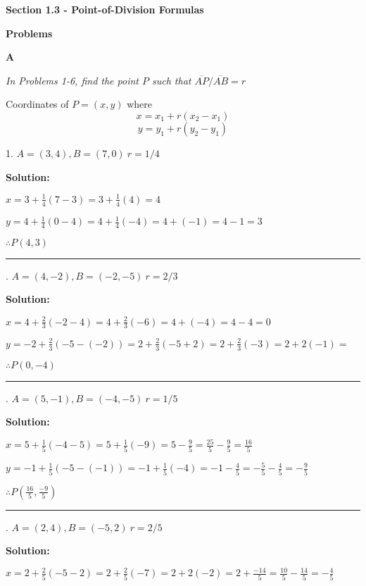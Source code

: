\documentclass[10pt,letterpaper]{article}
\begin{document}
\textbf{Section 1.3 - Point-of-Division Formulas}
\medskip

\textbf{Problems}

\medskip
\textbf{A}
\medskip

\textit{In Problems 1-6, find the point $P$ such that $\overline{AP}/\overline{AB} = r$}
\medskip

Coordinates of $P = (x,y)$ where 
\[ x=x_1 + r(x_2 - x_1)  \]
\[ y=y_1 + r(y_2 - y_1)  \]
\medskip

1. $A=(3,4), B=(7,0)\  r=1/4$

\medskip
{} {\textbf{{\color{blue}Solution}:}}

\medskip
$x =3 + \frac{1}{4} (7-3) = 3 + \frac{1}{4} (4) = 4$

\medskip
$y = 4 + \frac{1}{4}(0-4) = 4 + \frac{1}{4}(-4) = 4 + (-1) = 4 - 1 = 3$

\medskip
$\therefore P(4,3)$

\noindent\rule{15cm}{0.4pt}

. $A=(4,-2), B=(-2,-5)\  r=2/3$

\medskip
{} {\textbf{{\color{blue}Solution}:}}

\smallskip
$x=4+\frac{2}{3}(-2-4)=4+\frac{2}{3}(-6)=4+(-4)=4-4=0$

\smallskip
$y=-2+\frac{2}{3}(-5-(-2))=2+\frac{2}{3}(-5+2)=2+\frac{2}{3}(-3)=2+2(-1)=$

\smallskip
$\therefore P(0,-4)$

\noindent\rule{15cm}{0.4pt}

. $A=(5, -1), B=(-4,-5)\  r=1/5$

\medskip
{} {\textbf{{\color{blue}Solution}:}}

\smallskip
$x=5+\frac{1}{5}(-4-5)=5+\frac{1}{5}(-9)=5-\frac{9}{5}=\frac{25}{5}-\frac{9}{5}=\frac{16}{5}$

\smallskip
$y=-1+\frac{1}{5}(-5-(-1))=-1+\frac{1}{5}(-4)=-1-\frac{4}{5}=-\frac{5}{5}-\frac{4}{5}=-\frac{9}{5}$

\smallskip
$\therefore P(\frac{16}{5},\frac{-9}{5})$

\noindent\rule{15cm}{0.4pt}

. $A=(2,4), B=(-5,2)\  r=2/5$

\medskip
{} {\textbf{{\color{blue}Solution}:}}

\smallskip
$x=2+\frac{2}{5}(-5-2)=2+\frac{2}{5}(-7)=2+2(-2)=2+\frac{-14}{5}=\frac{10}{5}-\frac{14}{5}=-\frac{4}{5}$
\end{document}
